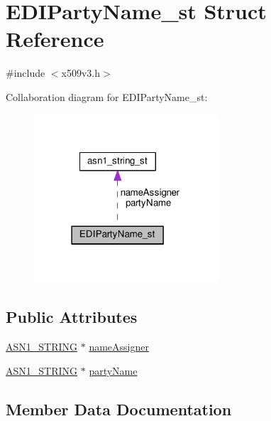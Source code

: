 \hypertarget{struct_e_d_i_party_name__st}{}\section{E\+D\+I\+Party\+Name\+\_\+st Struct Reference}
\label{struct_e_d_i_party_name__st}


{\ttfamily \#include $<$x509v3.\+h$>$}



Collaboration diagram for E\+D\+I\+Party\+Name\+\_\+st\+:
\nopagebreak
\begin{figure}[H]
\begin{center}
\leavevmode
\includegraphics[width=195pt]{struct_e_d_i_party_name__st__coll__graph}
\end{center}
\end{figure}
\subsection*{Public Attributes}
\begin{DoxyCompactItemize}
\item 
\hyperlink{ossl__typ_8h_ad37610875e38aa6c59f5e6e0b437e65c}{A\+S\+N1\+\_\+\+S\+T\+R\+I\+NG} $\ast$ \hyperlink{struct_e_d_i_party_name__st_a433a2feeea84e1856f17d0aaba7479fa}{name\+Assigner}
\item 
\hyperlink{ossl__typ_8h_ad37610875e38aa6c59f5e6e0b437e65c}{A\+S\+N1\+\_\+\+S\+T\+R\+I\+NG} $\ast$ \hyperlink{struct_e_d_i_party_name__st_ae0f4115f0794169a894b8a6e01539e50}{party\+Name}
\end{DoxyCompactItemize}


\subsection{Member Data Documentation}
